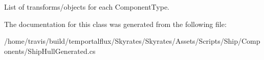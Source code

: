 List of transforms/objects for each Component\-Type. 



The documentation for this class was generated from the following file\-:\begin{DoxyCompactItemize}
\item 
/home/travis/build/temportalflux/\-Skyrates/\-Skyrates/\-Assets/\-Scripts/\-Ship/\-Components/Ship\-Hull\-Generated.\-cs\end{DoxyCompactItemize}
